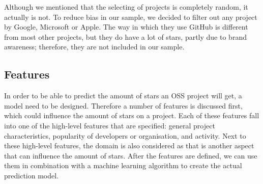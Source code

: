         Although we mentioned that the selecting of projects is completely random, it actually is not. To reduce bias in our sample, we decided to filter out any project by Google, Microsoft or Apple.
        The way in which they use GitHub is different from most other projects, but they do have a lot of stars, partly due to brand awareness; therefore, they are not included in our sample.
        
    
    \subsection{Features}
    In order to be able to predict the amount of stars an OSS project will get, a model need to be designed.
    Therefore a number of features is discussed first, which could influence the amount of stars on a project.
    Each of these features fall into one of the high-level features that are specified: general project characteristics, popularity of developers or organisation, and activity.
    Next to these high-level features, the domain is also considered as that is another aspect that can influence the amount of stars.
    After the features are defined, we can use them in combination with a machine learning algorithm to create the actual prediction model.\\

